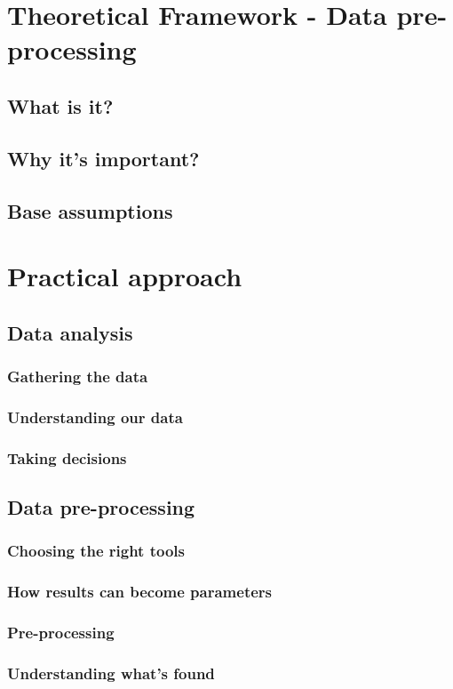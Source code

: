 \documentclass[a4paper,11pt]{article}
\begin{document}
\section{Theoretical Framework - Data pre-processing}
\subsection{What is it?}
\subsection{Why it's important?}
\subsection{Base assumptions}
\section{Practical approach}
\subsection{Data analysis}
\subsubsection{Gathering the data}
\subsubsection{Understanding our data}
\subsubsection{Taking decisions}
\subsection{Data pre-processing}
\subsubsection{Choosing the right tools}
\subsubsection{How results can become parameters}
\subsubsection{Pre-processing}
\subsubsection{Understanding what's found}


\newpage
\printbibliography
\end{document}

